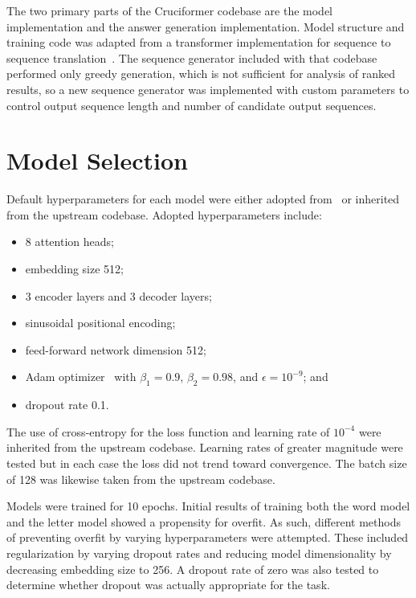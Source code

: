 \documentclass[letterpaper]{article} %
\begin{document}
\begin{NoHyper}
The two primary parts of the Cruciformer codebase are the model implementation and the answer generation implementation. Model structure and training code was adapted from a transformer implementation for sequence to sequence translation~\cite{chegde2022}. The sequence generator included with that codebase performed only greedy generation, which is not sufficient for analysis of ranked results, so a new sequence generator was implemented with custom parameters to control output sequence length and number of candidate output sequences.

\section{Model Selection}
\label{sec:model}

Default hyperparameters for each model were either adopted from~\citealp{vaswani2017} or inherited from the upstream codebase.
Adopted hyperparameters include:

\begin{itemize}
\item 8 attention heads;
\item embedding size 512;
\item 3 encoder layers and 3 decoder layers;
\item sinusoidal positional encoding;
\item feed-forward network dimension 512;
\item Adam optimizer~\cite{kingma2017adam} with $\beta_1 = 0.9$, $\beta_2 = 0.98$, and $\epsilon = 10^{-9}$; and
\item dropout rate 0.1.
\end{itemize}

The use of cross-entropy for the loss function and learning rate of $10^{-4}$ were inherited from the upstream codebase.
Learning rates of greater magnitude were tested but in each case the loss did not trend toward convergence.
The batch size of 128 was likewise taken from the upstream codebase.

Models were trained for 10 epochs.
Initial results of training both the word model and the letter model showed a propensity for overfit.
As such, different methods of preventing overfit by varying hyperparameters were attempted.
These included regularization by varying dropout rates and reducing model dimensionality by decreasing embedding size to 256.
A dropout rate of zero was also tested to determine whether dropout was actually appropriate for the task.


\end{NoHyper}
\end{document}
